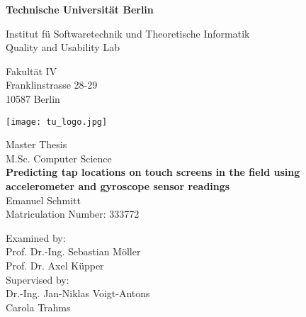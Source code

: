 \thispagestyle{empty}
\begin{center}

\vspace*{0.3cm}
{\LARGE \textbf{Technische Universität Berlin}}

\vspace{0.3cm}

{\large Institut f{\"u} Softwaretechnik und Theoretische Informatik\\[1mm]}
{\large Quality and Usability Lab\\[5mm]}

Fakultät IV\\
Franklinstrasse 28-29\\
10587 Berlin\\

\vspace*{1cm}

\texttt{[image: tu\_logo.jpg]}

\vspace*{1.0cm}

{\LARGE Master Thesis}\\
\vspace{0.3cm}
{\large M.Sc. Computer Science}\\

\vspace{0.8cm}
{\LARGE \textbf{Predicting tap locations on touch screens in the field using accelerometer and gyroscope sensor readings}}\\
\vspace*{0.8cm}
{\LARGE Emanuel Schmitt}
\\
\vspace*{0.5cm}
Matriculation Number: 333772\\
\vspace*{1.0cm}

Examined by:\\
Prof. Dr.-Ing. Sebastian Möller\\
Prof. Dr. Axel Küpper\\
\vspace*{0.3cm}
Supervised by:\\
Dr.-Ing. Jan-Niklas Voigt-Antons\\
Carola Trahms
\vspace{3cm}


\end{center}

